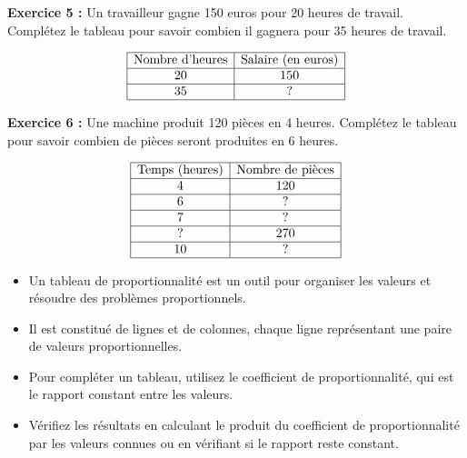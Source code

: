 \documentclass{article}
\begin{document}
\begin{tcolorbox}[colback=green!10!white, colframe=yellow!75!black, title=\textcolor{white}{Application directe}, 
                  sharp corners=south]
    \textbf{Exercice 5 :} Un travailleur gagne 150 euros pour 20 heures de travail. Complétez le tableau pour savoir combien il gagnera pour 35 heures de travail.

    \[
    \begin{array}{|c|c|}
    \hline
    \text{Nombre d'heures} & \text{Salaire (en euros)} \\
    \hline
    20 & 150 \\
    \hline
    35 & ? \\
    \hline
    \end{array}
    \]

    \textbf{Exercice 6 :} Une machine produit 120 pièces en 4 heures. Complétez le tableau pour savoir combien de pièces seront produites en 6 heures.

    \[
    \begin{array}{|c|c|}
    \hline
    \text{Temps (heures)} & \text{Nombre de pièces} \\
    \hline
    4 & 120 \\
    \hline
    6 & ? \\
    \hline
    7 & ? \\
    \hline
    ? & 270 \\
    \hline
    10 & ? \\
    \hline
    \end{array}
    \]
\end{tcolorbox}

\vspace{0.2cm}

\begin{tcolorbox}[colback=blue!10!white, colframe=cyan!75!black, title=\textcolor{white}{Récapitulatif}, 
                  sharp corners=south]

    \begin{itemize}
        \item Un tableau de proportionnalité est un outil pour organiser les valeurs et résoudre des problèmes proportionnels.
        \item Il est constitué de lignes et de colonnes, chaque ligne représentant une paire de valeurs proportionnelles.
        \item Pour compléter un tableau, utilisez le coefficient de proportionnalité, qui est le rapport constant entre les valeurs.
        \item Vérifiez les résultats en calculant le produit du coefficient de proportionnalité par les valeurs connues ou en vérifiant si le rapport reste constant.
    \end{itemize}
\end{tcolorbox}
\end{document}
